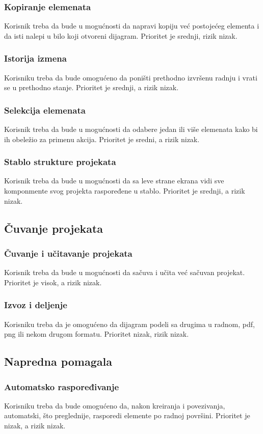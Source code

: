 \documentclass[a4paper]{article}
\begin{document}
\subsubsection{Kopiranje elemenata}
Korisnik treba da bude u mogućnosti da napravi kopiju već postojećeg elementa i da isti nalepi u bilo koji otvoreni dijagram. Prioritet je srednji, rizik nizak.  
\subsubsection{Istorija izmena}
Korisniku treba da bude omogućeno da poništi prethodno izvršenu radnju i vrati se u prethodno stanje. Prioritet je srednji, a rizik nizak.
\subsubsection{Selekcija elemenata}
Korisnik treba da bude u mogućnosti da odabere jedan ili više elemenata kako bi ih obeležio za primenu akcija. Prioritet je sredni, a rizik nizak.
\subsubsection{Stablo strukture projekata}
Korisnik treba da bude u mogućnosti da sa leve strane ekrana vidi sve komponmente svog projekta raspoređene u stablo. Prioritet je srednji, a rizik nizak. 
\subsection{Čuvanje projekata}
\subsubsection{Čuvanje i učitavanje projekata}
Korisnik treba da bude u mogućnosti da sačuva i učita već sačuvan projekat. Prioritet je visok, a rizik nizak.
\subsubsection{Izvoz i deljenje}
Korisniku treba da je omogućeno da dijagram podeli sa drugima u radnom, pdf, png ili nekom drugom formatu. Prioritet nizak, rizik nizak.
\subsection{Napredna pomagala}
\subsubsection{Automatsko raspoređivanje}
Korisniku treba da bude omogućeno da, nakon kreiranja i povezivanja, automatski, što preglednije, rasporedi elemente po radnoj površini. Prioritet je nizak, a rizik nizak. 
\end{document}
